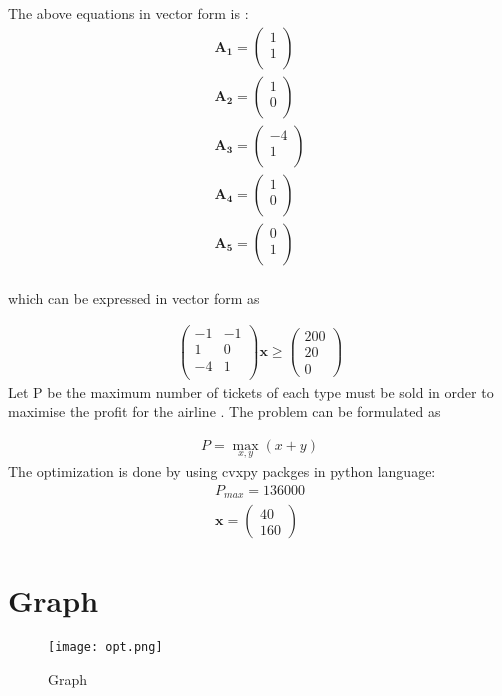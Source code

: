 \documentclass[10pt,twocolumn]{article}
\let\vec\mathbf
\newcommand{\myvec}[1]{\ensuremath{\begin{pmatrix}#1\end{pmatrix}}}
\begin{document}
\begin{flushleft}
The above equations in vector form is :
\begin{align}
\vec{A_1} = 
\begin{pmatrix}
1 \\
1 \\
\end{pmatrix} \\
\vec{A_2} = 
\begin{pmatrix}
1 \\
0 \\
\end{pmatrix} \\
\vec{A_3} = 
\begin{pmatrix}
-4 \\
1 \\
\end{pmatrix} \\
\vec{A_4} = 
\begin{pmatrix}
1 \\
0 \\
\end{pmatrix} \\
\vec{A_5} = 
\begin{pmatrix}
0 \\
1 \\
\end{pmatrix} \\
\end{align}
\begin{flushleft}
which can be expressed in vector form as
\end{flushleft}
\begin{align}
 \myvec{-1 &-1 \\ 1 & 0 \\ -4 & 1 \\} \vec{x}\ge \myvec{200 \\ 20 \\ 0}
\end{align}
Let P be the maximum number of tickets of each type must be sold in order to maximise the profit for the airline . The problem can be formulated as
\end{flushleft}
\begin{align}
	P = \max_{x,y}(x+y)
\end{align}
The optimization is done by using cvxpy packges in python language:
\begin{align}
	P_{max} = 136000 \\
	\vec{x} = \myvec{40 \\ 160}
\end{align}

\section{Graph}

\begin{figure}[h]
\texttt{[image: opt.png]}
\caption{Graph}
\label{fig:Graph}
\end{figure}
\end{document}
